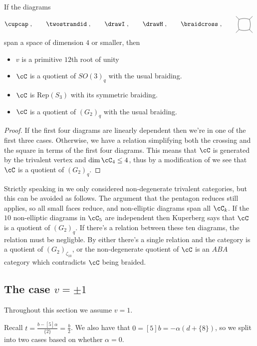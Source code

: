 \documentclass[12pt]{amsart}
\begin{document}
\begin{proposition} \label{prop:dim4}
If the diagrams  
  \[
  \cupcap\;,\qquad\twostrandid\;,
    \qquad\drawI\;,\qquad\drawH\;,\qquad\braidcross\;,\qquad\ngon[45]{4}\;
   \]
span a space of dimension $4$ or smaller, then
\begin{itemize}
\item $v$ is a primitive $12$th root of unity
\item $\cC$ is a quotient of $SO(3)_q$ with the usual braiding.
\item $\cC$ is $\mathrm{Rep}(S_3)$ with its symmetric braiding.
\item $\cC$ is a quotient of $(G_2)_q$ with the usual braiding.  
\end{itemize}
\end{proposition}
\begin{proof}
If the first four diagrams are linearly dependent then we're in one of the first three cases.  Otherwise, we have a relation simplifying both the crossing and the square in terms of the first four diagrams.  This means that $\cC$ is generated by the trivalent vertex and $\dim \cC_4 \leq 4$, thus by a modification of \cite{???} we see that $\cC$ is a quotient of $(G_2)_q$.
\end{proof}

\begin{remark}
Strictly speaking in \cite{???} we only considered non-degenerate trivalent categories, but this can be avoided as follows.  The argument that the pentagon reduces still applies, so all small faces reduce, and non-elliptic diagrams span all $\cC_k$.  If the $10$ non-elliptic diagrams in $\cC_5$ are independent then Kuperberg\cite{???} says that $\cC$ is a quotient of $(G_2)_q$.  If there's a relation between these ten diagrams, the relation must be negligble.  By \cite{???} either there's a single relation and the category is a quotient of $(G_2)_{\zeta_{10}}$, or the non-degenerate quotient of $\cC$ is an $ABA$ category which contradicts $\cC$ being braided.
\end{remark}



\subsection{The case $v = \pm 1$}

Throughout this section we assume $v=1$.

Recall $t = \frac{b-[5]\alpha}{\{2\}} = \frac{b}{2}$.  We also have that $0= [5]b = -\alpha (d+\{8\})$, so we split into two cases based on whether $\alpha = 0$.
\end{document}
